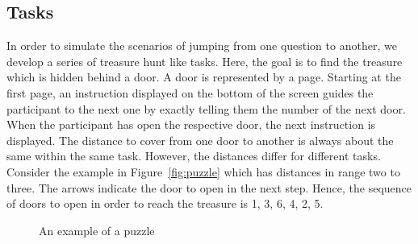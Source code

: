 \documentclass{sig-alternate-05-2015}
\begin{document}
\subsection{Tasks}
In order to simulate the scenarios of jumping from one question to another, we
develop a series of treasure hunt like tasks. Here, the goal is to find the
treasure which is hidden behind a door. A door is represented by a page.
Starting at the first page, an instruction displayed on the bottom of the
screen guides the participant to the next one by exactly telling them the
number of the next door. When the participant has open the respective door,
the next instruction is displayed. The distance to cover from one door to
another is always about the same within the same task. However, the
distances differ for different tasks. Consider the example in
Figure~\ref{fig:puzzle} which has distances in range two to three. The arrows
indicate the door to open in the next step. Hence, the sequence of doors to
open in order to reach the treasure is 1, 3, 6, 4, 2, 5.
\begin{figure}
  \caption{An example of a puzzle}
\end{figure}
\end{document}
